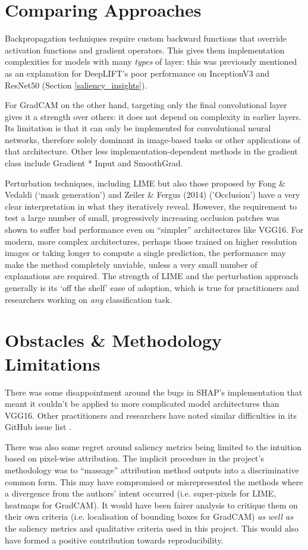 \documentclass[main]{subfiles}
\begin{document}
\section{Comparing Approaches}
Backpropagation techniques require custom backward functions that override activation functions and gradient operators. This gives them implementation complexities for models with many \textit{types} of layer: this was previously mentioned as an explanation for DeepLIFT's poor performance on InceptionV3 and ResNet50 (Section \ref{saliency_insights}).

For GradCAM on the other hand, targeting only the final convolutional layer gives it a strength over others: it does not depend on complexity in earlier layers. Its limitation is that it can only be implemented for convolutional neural networks, therefore solely dominant in image-based tasks or other applications of that architecture. Other less implementation-dependent methods in the gradient class include Gradient * Input and SmoothGrad.

Perturbation techniques, including LIME but also those proposed by Fong \& Vedaldi \cite{perturb_fong} (`mask generation') and Zeiler \& Fergus (2014) \cite{zeilerfergus2013} ('Occlusion') have a very clear interpretation in what they iteratively reveal. However, the requirement to test a large number of small, progressively increasing occlusion patches was shown to suffer bad performance even on ``simpler'' architectures like VGG16. For modern, more complex architectures, perhaps those trained on higher resolution images or taking longer to compute a single prediction, the performance may make the method completely unviable, unless a very small number of explanations are required. The strength of LIME and the perturbation approach generally is its `off the shelf' ease of adoption, which is true for practitioners and researchers working on \textit{any} classification task.

\section{Obstacles \& Methodology Limitations}

There was some disappointment around the bugs in SHAP's implementation that meant it couldn't be applied to more complicated model architectures than VGG16. Other practitioners and researchers have noted similar difficulties in its GitHub issue list \cite{shaprepo}.

There was also some regret around saliency metrics being limited to the intuition based on pixel-wise attribution. The implicit procedure in the project's methodology was to ``massage'' attribution method outputs into a discriminative common form. This may have compromised or misrepresented the methods where a divergence from the authors' intent occurred (i.e. super-pixels for LIME, heatmaps for GradCAM). It would have been fairer analysis to critique them on their own criteria (i.e. localisation of bounding boxes for GradCAM) \textit{as well as} the saliency metrics and qualitative criteria used in this project. This would also have formed a positive contribution towards reproducibility.
\end{document}
